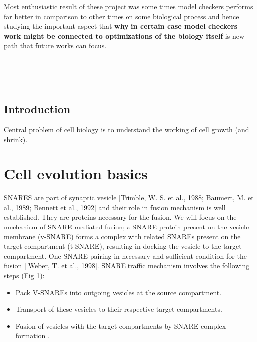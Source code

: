 \documentclass[preprint,12pt]{elsarticle}
\begin{document}
Most enthusiastic result of these project was some times model checkers performs far better in comparison to other times on some biological process and hence studying the important aspect that \textbf{why in certain case model checkers work might be connected to optimizations of the biology itself} is new path that future works can focus.  

























\\
\\
\\

\subsection{Introduction}
Central problem of cell biology is to understand the working of cell growth (and shrink). 

\section{Cell evolution basics}
SNARES are part of synaptic vesicle [Trimble, W. S. et al., 1988; Baumert, M. et al., 1989; Bennett et al., 1992] and their role in fusion mechanism is well established. They are proteins necessary for the fusion. We will focus on the mechanism of SNARE mediated fusion; a SNARE protein present on the vesicle membrane (v-SNARE) forms a complex with related SNAREs present on the target compartment (t-SNARE), resulting in docking the vesicle to the target compartment. One SNARE pairing in necessary and sufficient condition for the fusion [[Weber, T. et al., 1998]. 
SNARE traffic mechanism involves the following steps (Fig 1): 
\begin{itemize}
\item Pack V-SNAREs into outgoing vesicles at the source compartment.
\item Transport of these vesicles to their respective target compartments.
\item Fusion of vesicles with the target compartments by SNARE complex formation .
\end{itemize}
\end{document}
